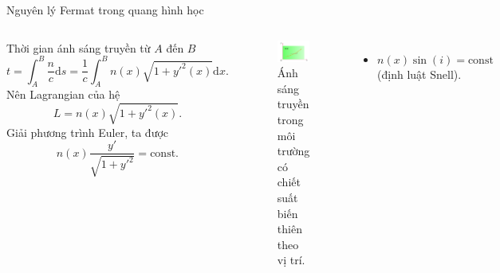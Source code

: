 \begin{frame}{Nguyên lý Fermat trong quang hình học}

\begin{columns}
    Thời gian ánh sáng truyền từ \(A\) đến \(B\)
    \begin{equation}
        t = \int_A^B \frac{n}{c} \mathrm{d}s = \frac{1}{c} \int_A^B n(x) \sqrt{1 + y'^2(x)} \mathrm{d}x.
    \end{equation}
    Nên Lagrangian của hệ
    \begin{equation}
        L = n(x) \sqrt{1 + y'^2(x)}.
    \end{equation}
    Giải phương trình Euler, ta được
    \begin{equation}
        n(x) \frac{y'}{\sqrt{1 + y'^2}} = \text{const}.
    \end{equation}
    \vspace{-9mm}
    \begin{figure}
        \centering
        \includegraphics[width=0.9\linewidth]{Figures/Gradient_index.pdf}
        \caption{Ánh sáng truyền trong môi trường có chiết suất biến thiên theo vị trí.}
        \label{fig:Gradient_index}
    \end{figure}
    \vspace{-4mm}
    \begin{itemize}
        \item \(n(x) \sin (i) = \text{const}\) (định luật Snell).
    \end{itemize}
\end{columns}


\end{frame}
